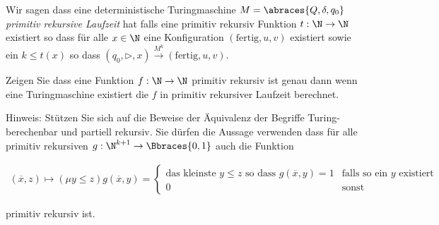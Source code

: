 
\begin{exercise}

Wir sagen dass eine deterministische Turingmaschine $M = \abraces{Q, \delta, q_0}$ \textit{primitiv rekursive Laufzeit} hat falls eine primitiv rekursiv Funktion $t: \N \to \N$ existiert so dass für alle $x \in \N$ eine Konfiguration $(\mathrm{fertig}, u, v)$ existiert sowie ein $k \leq t(x)$ so dass $(q_0, \triangleright, x) \xrightarrow{M^k} (\mathrm{fertig}, u, v)$.

Zeigen Sie dass eine Funktion $f: \N \to \N$ primitiv rekursiv ist genau dann wenn eine Turingmaschine existiert die $f$ in primitiv rekursiver Laufzeit berechnet.

\begin{itshape}

    Hinweis:
    Stützen Sie sich auf die Beweise  der Äquivalenz  der Begriffe Turing-berechenbar und partiell rekursiv.
    Sie dürfen die Aussage verwenden dass für alle primitiv rekursiven $g: \N^{k+1} \to \Bbraces{0, 1}$ auch die Funktion

    \begin{align*}
        (\overline x, z)
        \mapsto
        (\mu y \leq z) g(\overline x, y)
        =
        \begin{cases}
            \text{das kleinste $y \leq z$ so dass $g(\overline x, y) = 1$}
            & \text{falls so ein $y$ existiert} \\
            0
            & \text{sonst}
        \end{cases}
    \end{align*}

    primitiv rekursiv ist.

\end{itshape}

\end{exercise}


